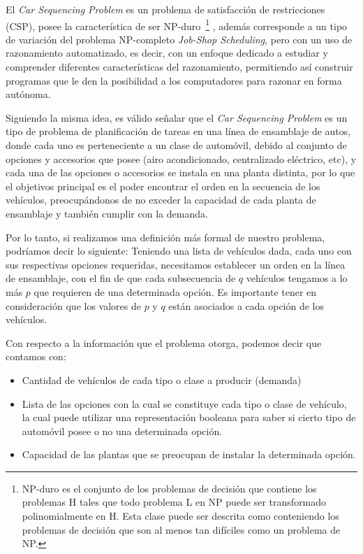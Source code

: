 
El \emph{Car Sequencing Problem} es un problema de satisfacción de restricciones (CSP), posee la
característica de ser NP-duro~\footnote{
NP-duro es el conjunto de los problemas de decisión que contiene los problemas H
tales que todo problema L en NP puede ser transformado polinomialmente en H.
Esta clase puede ser descrita como conteniendo los problemas de decisión que son
al menos tan difíciles como un problema de NP.}
, además corresponde a un tipo de variación del problema NP-completo \emph{Job-Shop Scheduling},
pero con un uso de razonamiento automatizado, es decir, con un enfoque dedicado a estudiar y comprender
diferentes características del razonamiento, permitiendo así construir programas que le den la posibilidad
a los computadores para razonar en forma autónoma.
 
Siguiendo la misma idea, es válido señalar que el \emph{Car Sequencing Problem} es un tipo de problema de planificación
de tareas en una línea de ensamblaje de autos, donde cada uno es perteneciente a un clase de automóvil, debido al conjunto
de opciones y accesorios que posee (airo acondicionado, centralizado eléctrico, etc), y cada una de las opciones o
accesorios se instala en una planta distinta, por lo que el objetivos principal es el poder encontrar el orden en la
secuencia de los vehículos, preocupándonos de no exceder la capacidad de cada planta de ensamblaje y también cumplir con la demanda.

Por lo tanto, si realizamos una definición más formal de nuestro problema, podríamos decir lo siguiente:
Teniendo una lista de vehículos dada, cada uno con sus respectivas opciones requeridas,
necesitamos establecer un orden en la línea de ensamblaje, con el fin de que cada subsecuencia de $q$ vehículos
tengamos a lo más $p$ que requieren de una determinada opción. Es importante tener en consideración que los
valores de $p$ y $q$ están asociados a cada opción de los vehículos.

Con respecto a la información que el problema otorga, podemos decir que contamos con:
\begin{itemize}
	\item Cantidad de vehículos de cada tipo o clase a producir (demanda)
	\item Lista de las opciones con la cual se constituye cada tipo o clase de vehículo, la cual puede utilizar una representación
		booleana para saber si cierto tipo de automóvil posee o no una determinada opción.
	\item Capacidad de las plantas que se preocupan de instalar la determinada opción.
\end{itemize}

